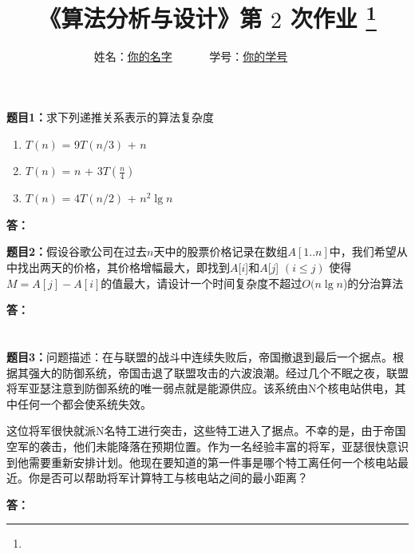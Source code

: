 \documentclass[12pt,a4paper]{article}
\begin{document}
\title{
{\heiti《算法分析与设计》第 {$2$} 次作业
\footnote{
}
}
}
\date{}

\author{
姓名：\underline{你的名字}~~~~~~
学号：\underline{你的学号}~~~~~~}

\maketitle

\noindent
\section*{\heiti \color{red}{算法分析题}}
\noindent
{\bf 题目1：}求下列递推关系表示的算法复杂度
\begin{enumerate}
\item[(1)]  $T(n)$ = 9$T(n/3)$ + $n$
\item[(2)] $T(n)$ = $n$ + $3T(\frac{n}{4})$
\item[(3)] $T(n)$ = $4T(n/2)$ + $n^2\lg{n}$
\end{enumerate}


\vspace{5pt}
\noindent
{\bf 答：}

\vspace{10pt}
\noindent
{\bf 题目2：}假设谷歌公司在过去$n$天中的股票价格记录在数组$A[1..n]$中，我们希望从中找出两天的价格，其价格增幅最大，即找到$A$[$i$]和$A$[$j$] $(i\leq j)$ 使得$M=A[j]-A[i]$的值最大，请设计一个时间复杂度不超过$O(n\lg{n}$)的分治算法

\vspace{5pt}
\noindent
{\bf 答：}
\noindent
\section*{\heiti \color{red}{算法实现题}}
\vspace{10pt}
\noindent
{\bf 题目3：}问题描述：在与联盟的战斗中连续失败后，帝国撤退到最后一个据点。根据其强大的防御系统，帝国击退了联盟攻击的六波浪潮。经过几个不眠之夜，联盟将军亚瑟注意到防御系统的唯一弱点就是能源供应。该系统由N个核电站供电，其中任何一个都会使系统失效。

这位将军很快就派N名特工进行突击，这些特工进入了据点。不幸的是，由于帝国空军的袭击，他们未能降落在预期位置。作为一名经验丰富的将军，亚瑟很快意识到他需要重新安排计划。他现在要知道的第一件事是哪个特工离任何一个核电站最近。你是否可以帮助将军计算特工与核电站之间的最小距离？


\vspace{5pt}
\noindent
{\bf 答：}
\end{document}
